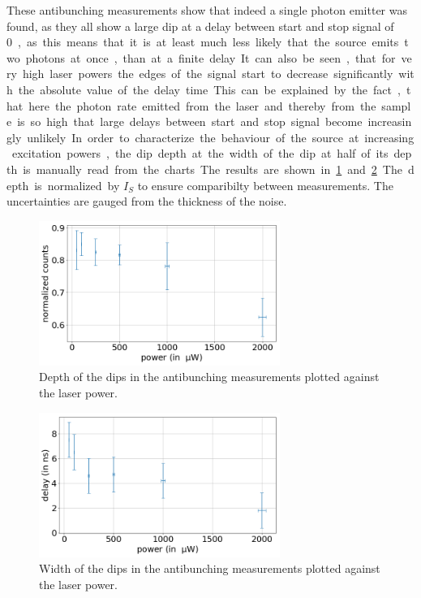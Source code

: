 These antibunching measurements show that indeed a single photon emitter was found, as they all show a large dip at a delay between start and stop signal of \SI{0}, as this means that it is at least much less likely that the source emits two photons at once, than at a finite delay.
It can also be seen, that for very high laser powers the edges of the signal start to decrease significantly with the absolute value of the delay time.
This can be explained by the fact, that here the photon rate emitted from the laser and thereby from the sample is so high that large delays between start and stop signal become increasingly unlikely.

In order to characterize the behaviour of the source at increasing excitation powers, the dip depth at the width of the dip at half of its depth is manually read from the charts.
The results are shown in \cref{fig_dip_depth} and \cref{fig_dip_width}.
The depth is normalized by $I_S$ to ensure comparibilty between measurements.
The uncertainties are gauged from the thickness of the noise.

\begin{figure}[H]
    \centering
    \includegraphics[width=0.7\textwidth]{img/output_t2/dip_depth.png}
    \caption{Depth of the dips in the antibunching measurements plotted against the laser power.}
    \label{fig_dip_depth}
\end{figure}

\begin{figure}[H]
    \centering
    \includegraphics[width=0.7\textwidth]{img/output_t2/dip_width.png}
    \caption{Width of the dips in the antibunching measurements plotted against the laser power.}
    \label{fig_dip_width}
\end{figure}

